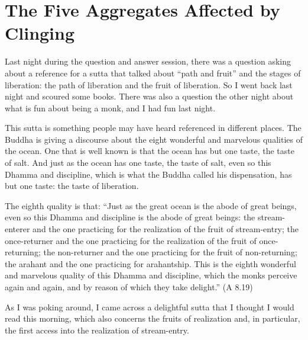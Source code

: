 \chapter{The Five Aggregates Affected by Clinging}

Last night during the question and answer session, there was a question
asking about a reference for a sutta that talked about “path and fruit”
and the stages of liberation: the path of liberation and the fruit of
liberation. So I went back last night and scoured some books. There was
also a question the other night about what is fun about being a monk,
and I had fun last night.

This sutta is something people may have heard referenced in different
places. The Buddha is giving a discourse about the eight wonderful and
marvelous qualities of the ocean. One that is well known is that the
ocean has but one taste, the taste of salt. And just as the ocean has
one taste, the taste of salt, even so this Dhamma and discipline, which
is what the Buddha called his dispensation, has but one taste: the taste
of liberation.

The eighth quality is that: “Just as the great ocean is the abode of
great beings, even so this Dhamma and discipline is the abode of great
beings: the stream-enterer and the one practicing for the realization of
the fruit of stream-entry; the once-returner and the one practicing for
the realization of the fruit of once-returning; the non-returner and the
one practicing for the fruit of non-returning; the arahant and the one
practicing for arahantship. This is the eighth wonderful and marvelous
quality of this Dhamma and discipline, which the monks perceive again
and again, and by reason of which they take delight.” (A 8.19)

As I was poking around, I came across a delightful sutta that I thought
I would read this morning, which also concerns the fruits of realization
and, in particular, the first access into the realization of
stream-entry.

